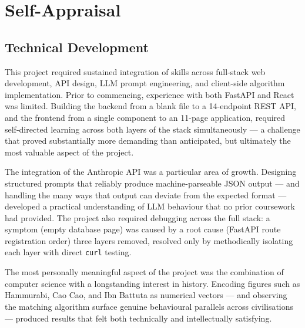 \documentclass[11pt, a4paper]{report}
\begin{document}



\appendix
{}

\chapter{Self-Appraisal}

\section{Technical Development}

This project required sustained integration of skills across full-stack web development, API design, LLM prompt engineering, and client-side algorithm implementation. Prior to commencing, experience with both FastAPI and React was limited. Building the backend from a blank file to a 14-endpoint REST API, and the frontend from a single component to an 11-page application, required self-directed learning across both layers of the stack simultaneously — a challenge that proved substantially more demanding than anticipated, but ultimately the most valuable aspect of the project.

The integration of the Anthropic API was a particular area of growth. Designing structured prompts that reliably produce machine-parseable JSON output — and handling the many ways that output can deviate from the expected format — developed a practical understanding of LLM behaviour that no prior coursework had provided. The project also required debugging across the full stack: a symptom (empty database page) was caused by a root cause (FastAPI route registration order) three layers removed, resolved only by methodically isolating each layer with direct \texttt{curl} testing.

The most personally meaningful aspect of the project was the combination of computer science with a longstanding interest in history. Encoding figures such as Hammurabi, Cao Cao, and Ibn Battuta as numerical vectors — and observing the matching algorithm surface genuine behavioural parallels across civilisations — produced results that felt both technically and intellectually satisfying.
\end{document}
